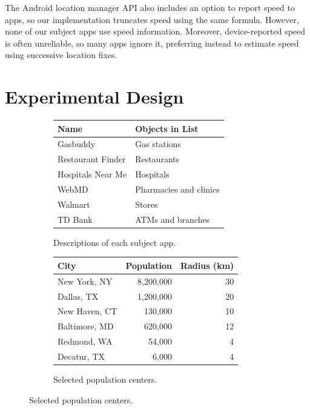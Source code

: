 \documentclass[10pt, conference, compsocconf]{IEEEtran}
\newcommand{\app}[1]{#1}
\newcommand{\hospitals}{\app{Hospitals Near Me}}
\newcommand{\tdbank}{\app{TD Bank}}
\newcommand{\webmd}{\app{WebMD}}
\newcommand{\gasbuddy}{\app{Gasbuddy}}
\newcommand{\restaurantfinder}{\app{Restaurant Finder}}
\newcommand{\walmart}{\app{Walmart}}
\begin{document}
{The Android location
manager API also includes an option to report speed to apps, so our
implementation truncates speed using the same formula. However, none
of our subject apps use speed information. Moreover, device-reported
speed is often unreliable, so many apps ignore it, preferring
instead to estimate speed using successive location fixes.

\section{Experimental Design}
\label{sec:design}

\begin{figure}
  \small
  \begin{subfigure}{\columnwidth}
    \centering
    \begin{tabular}{|l|l|}
      \hline
      Name & Objects in List \\ \hline \hline
      \gasbuddy & Gas stations \\
      \restaurantfinder & Restaurants \\
      \hospitals & Hospitals \\
      \webmd & Pharmacies and clinics \\
      \walmart & Stores \\
      \tdbank & ATMs and branches \\
      \hline
    \end{tabular}
    \caption{Descriptions of each subject app.}
    \label{fig:app-descriptions}
  \end{subfigure}

  \bigskip{}

  \begin{subfigure}{\columnwidth}
      \centering
      \begin{tabular}{|l|r|r|}
        \hline
        City & Population & Radius (km) \\ \hline \hline
        New York, NY & 8,200,000 & 30 \\ \hline
        Dallas, TX & 1,200,000 & 20 \\ \hline
        New Haven, CT & 130,000 & 10 \\ \hline
        Baltimore, MD & 620,000 & 12 \\ \hline
        Redmond, WA & 54,000 & 4 \\ \hline
        Decatur, TX & 6,000 & 4 \\ \hline
      \end{tabular}
      \caption{Selected population centers.}
      \label{fig:regions}
    \end{subfigure}


\end{figure}}
\end{document}
